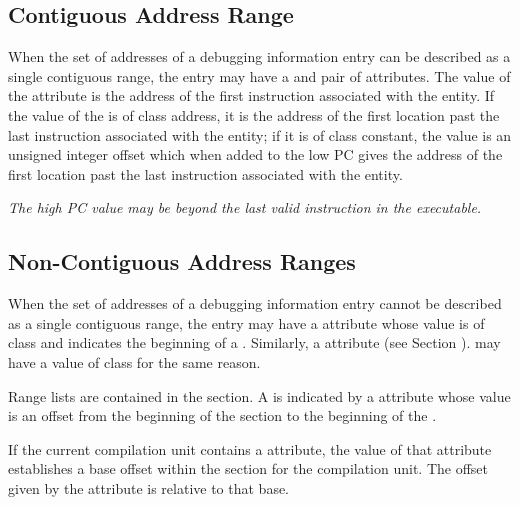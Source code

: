 \subsection{Contiguous Address Range}
\eb
\label{chap:contiguousaddressranges}
When the set of addresses of a debugging information entry can
be described as a single contiguous range, the entry 
may 
have a \DWATlowpc{} and \DWAThighpc{} pair of attributes. 
The value of the \DWATlowpc{} attribute is the \bb\eb address of the
first instruction associated with the entity. If the value of
the \DWAThighpc{} is of class address, it is the \bb\eb
address of the first location past the last instruction
associated with the entity; if it is of class constant, the
value is an unsigned integer offset which when added to the
low PC gives the address of the first location past the last
instruction associated with the entity.

\textit{The high PC value
may be beyond the last valid instruction in the executable.}

\bbpareb

\subsection{Non-Contiguous Address Ranges}
\label{chap:noncontiguousaddressranges}
When the set of addresses of a debugging information entry
cannot be described as a single contiguous range, the entry 
\bb
may have
\eb
a \DWATranges{} attribute
whose value is of class 
and indicates the beginning of a .
Similarly,
a \DWATstartscope{} attribute
\bb
(see Section ).
\eb
may have a value of class
 for the same reason.  

Range lists are contained in 
\bb
the \dotdebugranges{} section. 
\eb
A  is indicated by a 
\DWATranges{} attribute
whose value is 
\bb\eb
an offset from the beginning of the
\dotdebugranges{} section to the beginning of the 
.

If the current compilation unit contains a \DWATrangesbase{}
attribute, the value of that attribute establishes a base
offset within the \dotdebugranges{} section for the compilation
unit. The offset given by the \DWATranges{} attribute is
relative to that base.

